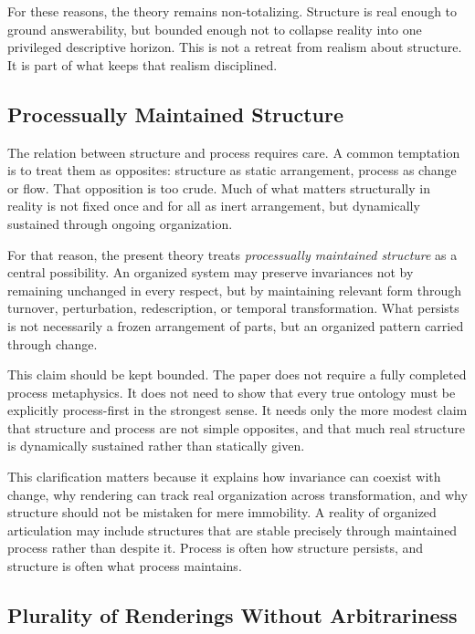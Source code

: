 \documentclass[11pt]{article}
\renewcommand{\emph}[1]{\textit{#1}}
\begin{document}
For these reasons, the theory remains non-totalizing. Structure is real enough to ground answerability, but bounded enough not to collapse reality into one privileged descriptive horizon. This is not a retreat from realism about structure. It is part of what keeps that realism disciplined.

\subsection{Processually Maintained Structure}

The relation between structure and process requires care. A common temptation is to treat them as opposites: structure as static arrangement, process as change or flow. That opposition is too crude. Much of what matters structurally in reality is not fixed once and for all as inert arrangement, but dynamically sustained through ongoing organization.

For that reason, the present theory treats \emph{processually maintained structure} as a central possibility. An organized system may preserve invariances not by remaining unchanged in every respect, but by maintaining relevant form through turnover, perturbation, redescription, or temporal transformation. What persists is not necessarily a frozen arrangement of parts, but an organized pattern carried through change. \cite{Whitehead1978ProcessReality,Rescher1996ProcessMetaphysics,TognoliKelso2014MetastableBrain}

This claim should be kept bounded. The paper does not require a fully completed process metaphysics. It does not need to show that every true ontology must be explicitly process-first in the strongest sense. It needs only the more modest claim that structure and process are not simple opposites, and that much real structure is dynamically sustained rather than statically given.

This clarification matters because it explains how invariance can coexist with change, why rendering can track real organization across transformation, and why structure should not be mistaken for mere immobility. A reality of organized articulation may include structures that are stable precisely through maintained process rather than despite it. Process is often how structure persists, and structure is often what process maintains.

\subsection{Plurality of Renderings Without Arbitrariness}
\end{document}
